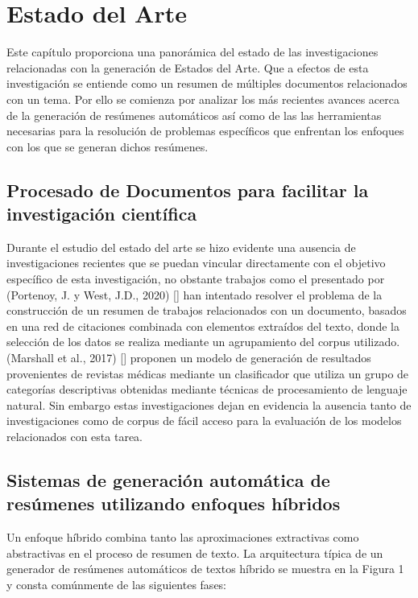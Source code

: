 \chapter{Estado del Arte}\label{chapter:state-of-the-art}
    Este capítulo proporciona una panorámica del estado de las investigaciones relacionadas con la generación de Estados del Arte. Que a efectos de esta investigación se entiende como un resumen de múltiples documentos relacionados con un tema. Por ello se comienza por analizar los más recientes avances acerca de la generación de resúmenes automáticos así como de las las herramientas necesarias para la resolución de problemas específicos que enfrentan los enfoques con los que se generan dichos resúmenes.

\section{Procesado de Documentos para facilitar la investigación científica}
Durante el estudio del estado del arte se hizo evidente una ausencia de investigaciones recientes que se puedan vincular directamente con el objetivo específico de esta investigación, no obstante trabajos como el presentado por (Portenoy, J. y West, J.D., 2020) [\cite{portenoy2020constructing}] han intentado resolver el problema de la construcción de un resumen de trabajos relacionados con un documento, basados en una red de citaciones combinada con elementos extraídos del texto, donde la selección de los datos se realiza mediante un agrupamiento del corpus utilizado. (Marshall et al., 2017) [\cite{marshall}] 
proponen un modelo de generación de resultados provenientes de revistas médicas mediante un clasificador que utiliza un grupo de categorías descriptivas obtenidas mediante técnicas de procesamiento de lenguaje natural. Sin embargo estas investigaciones dejan en evidencia la ausencia tanto de investigaciones como de corpus de fácil acceso para la evaluación de los modelos relacionados con esta tarea.

\section{Sistemas de generación automática de resúmenes utilizando enfoques híbridos}

Un enfoque híbrido combina tanto las aproximaciones extractivas como abstractivas en el proceso de resumen de texto. La arquitectura típica  de un generador de resúmenes automáticos de textos híbrido se muestra en la Figura 1 y consta comúnmente de las siguientes fases:

